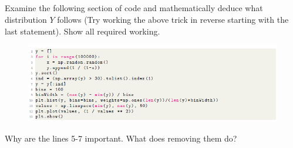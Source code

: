 \documentclass[answers]{exam}
\begin{document}
\subsection{} Examine the following section of code and mathematically deduce what distribution $Y$ follows (Try working the above trick in reverse starting with the last statement). Show all required working. \begin{figure}[H]
            \centering
            \includegraphics[width= 1.0\textwidth]{Question2.2_ques_code.png}
\end{figure}
Why are the lines 5-7 important. What does removing them do?
\end{document}
